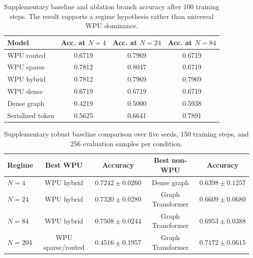 \documentclass[11pt]{article}
\begin{document}
\begin{table}[h]
\centering
\begin{tabular}{lccc}
\toprule
Model & Acc. at \(N=4\) & Acc. at \(N=24\) & Acc. at \(N=84\) \\
\midrule
WPU routed & 0.6719 & 0.7969 & 0.6719 \\
WPU sparse & 0.7812 & 0.8047 & 0.6719 \\
WPU hybrid & 0.7812 & 0.7969 & 0.7969 \\
WPU dense & 0.6719 & 0.6719 & 0.6719 \\
Dense graph & 0.4219 & 0.5000 & 0.5938 \\
Serialized token & 0.5625 & 0.6641 & 0.7891 \\
\bottomrule
\end{tabular}
\caption{Supplementary baseline and ablation branch accuracy after 100 training
steps. The result supports a regime hypothesis rather than universal WPU
dominance.}
\label{tab:supp-baselines}
\end{table}

\begin{table}[h]
\centering
\begin{tabular}{lcccc}
\toprule
Regime & Best WPU & Accuracy & Best non-WPU & Accuracy \\
\midrule
\(N=4\) & WPU hybrid & \(0.7242 \pm 0.0260\) & Dense graph & \(0.6398 \pm 0.1257\) \\
\(N=24\) & WPU hybrid & \(0.7320 \pm 0.0280\) & Graph Transformer & \(0.6609 \pm 0.0680\) \\
\(N=84\) & WPU hybrid & \(0.7508 \pm 0.0244\) & Graph Transformer & \(0.6953 \pm 0.0388\) \\
\(N=204\) & WPU sparse/routed & \(0.4516 \pm 0.1957\) & Graph Transformer & \(0.7172 \pm 0.0615\) \\
\bottomrule
\end{tabular}
\caption{Supplementary robust baseline comparison over five seeds, 150 training
steps, and 256 evaluation samples per condition.}
\label{tab:supp-robust-baselines}
\end{table}
\end{document}
